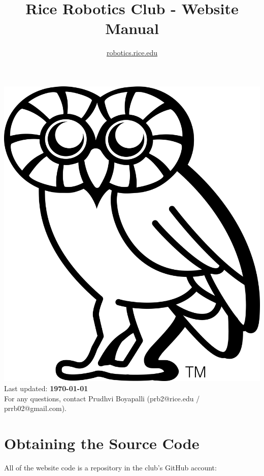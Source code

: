 \documentclass{article}
\begin{document}
    \title{Rice Robotics Club - Website Manual}
    \author{\url{robotics.rice.edu}}
    \date{}


    \maketitle
    \begin{center}
        \vfill
        \includegraphics[scale=0.25]{../home_images/rice/blackowl.jpg}
        \vfill
        Last updated: \textbf{\today}\\

        For any questions, contact Prudhvi Boyapalli
    (prb2@rice.edu / prrb02@gmail.com).
    \end{center}

    \newpage

    \section{Obtaining the Source Code}
    \label{sec:Obtaining the Source Code}
    All of the website code is a repository in the club's GitHub account:\\
\end{document}

